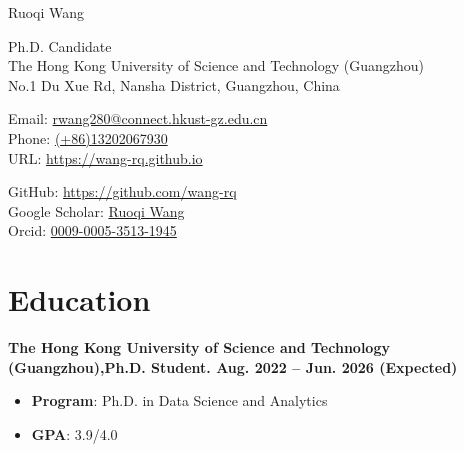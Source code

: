 \documentclass[letterpaper,10pt]{article}
\begin{document}
\begin{CJK}{UTF8}{gbsn}

\begin{center}
    {\huge Ruoqi Wang} \\ \vspace{2pt}

    Ph.D. Candidate\\
    The Hong Kong University of Science and Technology (Guangzhou) \\
    No.1 Du Xue Rd, Nansha District, Guangzhou, China
    \begin{multicols}{2}
    \begin{flushleft}
    
    Email: \href{mailto:{rwang280@connect.hkust-gz.edu.cn}}{rwang280@connect.hkust-gz.edu.cn} \\
    Phone: \href{{your phone number}}{(+86)13202067930} \\
    URL: \href{{https://wang-rq.github.io}}{https://wang-rq.github.io} \\
    
    \end{flushleft}
    
    \begin{flushright}

    GitHub: \href{{https://github.com/wang-rq}}{https://github.com/wang-rq}\\
    Google Scholar: \href{{https://scholar.google.com/citations?user=AHk1W2EAAAAJ&hl=zh-CN}}{Ruoqi Wang} \\
    Orcid: \href{{https://orcid.org/0009-0005-3513-1945}}{0009-0005-3513-1945}
    
    
    \end{flushright}
    \end{multicols}
\end{center}

\section{\Large{Education}}

\textbf{The Hong Kong University of Science and Technology (Guangzhou),\space \space \space \space  Ph.D. Student. \space \space \space \space     \hfill Aug. 2022 -- Jun. 2026 (Expected)} 
\begin{itemize}
        \vspace{-2pt}
        \item \textbf{Program}: Ph.D. in Data Science and Analytics
        \vspace{-2pt}
        \item \textbf{GPA}: 3.9/4.0
    \end{itemize}


\end{CJK}
\end{document}

